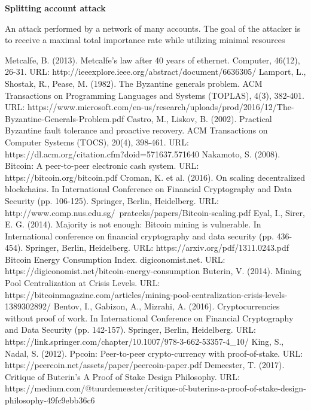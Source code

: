 \documentclass[a4paper,12pt]{article}
\begin{document}
\textbf{Splitting account attack} 

An attack performed by a network of many accounts. The goal of the attacker is to receive a maximal total importance rate while utilizing minimal resources
\begin{thebibliography}{99}
  Metcalfe, B. (2013). Metcalfe's law after 40 years of ethernet. Computer, 46(12), 26-31. URL: http://ieeexplore.ieee.org/abstract/document/6636305/
  Lamport, L., Shostak, R., Pease, M. (1982). The Byzantine generals problem. ACM Transactions on Programming Languages and Systems (TOPLAS), 4(3), 382-401. URL: https://www.microsoft.com/en-us/research/uploads/prod/2016/12/The-Byzantine-Generals-Problem.pdf
  Castro, M., Liskov, B. (2002). Practical Byzantine fault tolerance and proactive recovery. ACM Transactions on Computer Systems (TOCS), 20(4), 398-461. URL: https://dl.acm.org/citation.cfm?doid=571637.571640
  Nakamoto, S. (2008). Bitcoin: A peer-to-peer electronic cash system. URL: https://bitcoin.org/bitcoin.pdf
  Croman, K. et al. (2016). On scaling decentralized blockchains. In International Conference on Financial Cryptography and Data Security (pp. 106-125). Springer, Berlin, Heidelberg. URL: http://www.comp.nus.edu.sg/~prateeks/papers/Bitcoin-scaling.pdf
  Eyal, I., Sirer, E. G. (2014). Majority is not enough: Bitcoin mining is vulnerable. In International conference on financial cryptography and data security (pp. 436-454). Springer, Berlin, Heidelberg. URL: https://arxiv.org/pdf/1311.0243.pdf
  Bitcoin Energy Consumption Index. digiconomist.net. URL: https://digiconomist.net/bitcoin-energy-consumption
  Buterin, V. (2014). Mining Pool Centralization at Crisis Levels. URL: https://bitcoinmagazine.com/articles/mining-pool-centralization-crisis-levels-1389302892/
  Bentov, I., Gabizon, A., Mizrahi, A. (2016). Cryptocurrencies without proof of work. In International Conference on Financial Cryptography and Data Security (pp. 142-157). Springer, Berlin, Heidelberg. URL: https://link.springer.com/chapter/10.1007/978-3-662-53357-4\_10/
  King, S., Nadal, S. (2012). Ppcoin: Peer-to-peer crypto-currency with proof-of-stake. URL: https://peercoin.net/assets/paper/peercoin-paper.pdf
  Demeester, T. (2017). Critique of Buterin’s A Proof of Stake Design Philosophy. URL: https://medium.com/@tuurdemeester/critique-of-buterins-a-proof-of-stake-design-philosophy-49fc9ebb36c6

\end{thebibliography}
\end{document}
